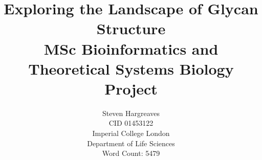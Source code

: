 \documentclass[12pt,a4paper]{article}
\begin{document}
{\selectfont}
\title{\Huge Exploring the Landscape of Glycan Structure\vspace{1cm}\\ \large  MSc Bioinformatics and Theoretical Systems Biology Project\vspace{11cm}}

\date{}

\author{\Large Steven Hargreaves\\
\normalsize CID 01453122 \\\vspace{0.5cm}
\normalsize Imperial College London \\
\normalsize Department of Life Sciences \\
\normalsize Word Count: 5479}


\maketitle
\newpage
\end{document}
